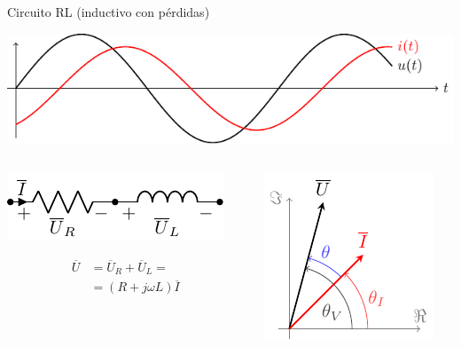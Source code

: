 \documentclass[xcolor={usenames,svgnames,dvipsnames}]{beamer}
\begin{document}
\begin{frame}[label={sec:orgf4fe804}]{Circuito RL (inductivo con pérdidas)}
\begin{center}
\includegraphics[height=0.25\textheight]{figs/inductivo.pdf}
\end{center}
\begin{columns}
\begin{column}{0.45\columnwidth}
\begin{center}
\includegraphics[width=.9\linewidth]{figs/RL.pdf}
\end{center}

\begin{align*}
  \overline{U} &= \overline{U}_R + \overline{U}_L =\\
	       &=(R + j\omega L) \overline{I}
\end{align*}
\end{column}
\begin{column}{0.55\columnwidth}
\begin{center}
\includegraphics[height=0.5\textheight]{figs/fasorInductanciaReal_VI.pdf}
\end{center}
\end{column}
\end{columns}
\end{frame}
\end{document}
